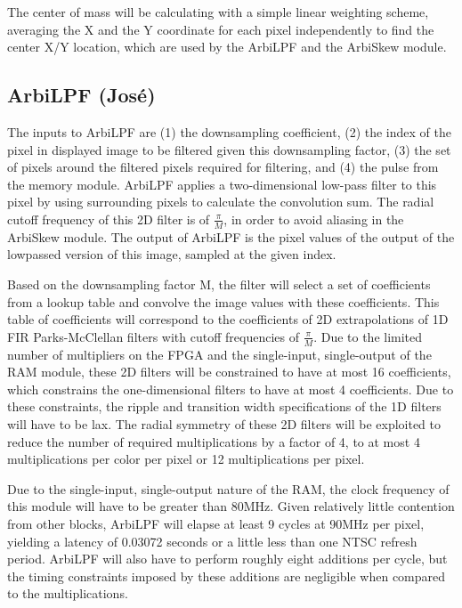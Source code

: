 \documentclass[10pt]{article}
\begin{document}
The center of mass will be calculating with a simple linear weighting scheme, averaging the X and the Y coordinate for each pixel independently to find the center X/Y location, which are used by the ArbiLPF and the ArbiSkew module.

\subsection{ArbiLPF (Jos\'{e})}
The inputs to ArbiLPF are (1) the downsampling coefficient, (2) the index of the pixel in displayed image to be filtered given this downsampling factor, (3) the set of pixels around the filtered pixels required for filtering, and (4) the pulse from the memory module. ArbiLPF applies a two-dimensional low-pass filter to this pixel by using surrounding pixels to calculate the convolution sum. The radial cutoff frequency of this 2D filter is of \( \frac{\pi}{M} \), in order to avoid aliasing in the ArbiSkew module. The output of ArbiLPF is the pixel values of the output of the lowpassed version of this image, sampled at the given index.

Based on the downsampling factor M, the filter will select a set of coefficients from a lookup table and convolve the image values with these coefficients. This table of coefficients will correspond to the coefficients of 2D extrapolations of 1D FIR Parks-McClellan filters with cutoff frequencies of \( \frac{\pi}{M} \). Due to the limited number of multipliers on the FPGA and the single-input, single-output of the RAM module, these 2D filters will be constrained to have at most 16 coefficients, which constrains the one-dimensional filters to have at most 4 coefficients. Due to these constraints, the ripple and transition width specifications of the 1D filters will have to be lax. The radial symmetry of these 2D filters will be exploited to reduce the number of required multiplications by a factor of 4, to at most 4 multiplications per color per pixel or 12 multiplications per pixel.

Due to the single-input, single-output nature of the RAM, the clock frequency of this module will have to be greater than 80MHz. Given relatively little contention from other blocks, ArbiLPF will elapse at least 9 cycles at 90MHz per pixel, yielding a latency of 0.03072 seconds or a little less than one NTSC refresh period. ArbiLPF will also have to perform roughly eight additions per cycle, but the timing constraints imposed by these additions are negligible when compared to the multiplications.
\end{document}
